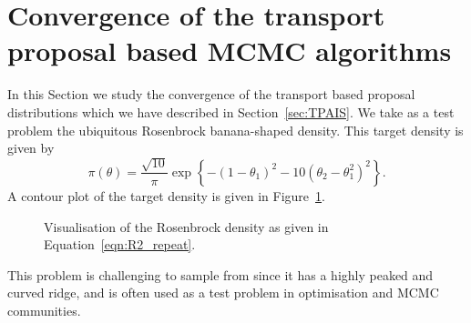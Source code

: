 \documentclass[final]{siamltex}
\begin{document}
\section[Convergence of transport MCMC]{Convergence of the transport proposal based MCMC algorithms}\label{sec:conv}

In this Section we study the convergence of the transport based
proposal distributions which we have described in
Section~\ref{sec:TPAIS}.
We take as a test problem the ubiquitous Rosenbrock banana-shaped
density. This target density is given by
\begin{equation}\label{eqn:R2_repeat}
	\pi(\theta) = \frac{\sqrt{10}}{\pi}\exp\left\{ -(1 - \theta_1)^2 - 10(\theta_2 - \theta_1^2)^2 \right\}.
\end{equation}
A contour plot of the target density is given in Figure~\ref{fig:R2_posterior}.
\begin{figure}
\centering
{}
\caption{Visualisation of the Rosenbrock density as given in Equation~\eqref{eqn:R2_repeat}.}
\label{fig:R2_posterior}
\end{figure}
This problem is challenging to sample from since it has a highly peaked and curved ridge, and is often used
as a test problem in optimisation and MCMC communities.
\end{document}
